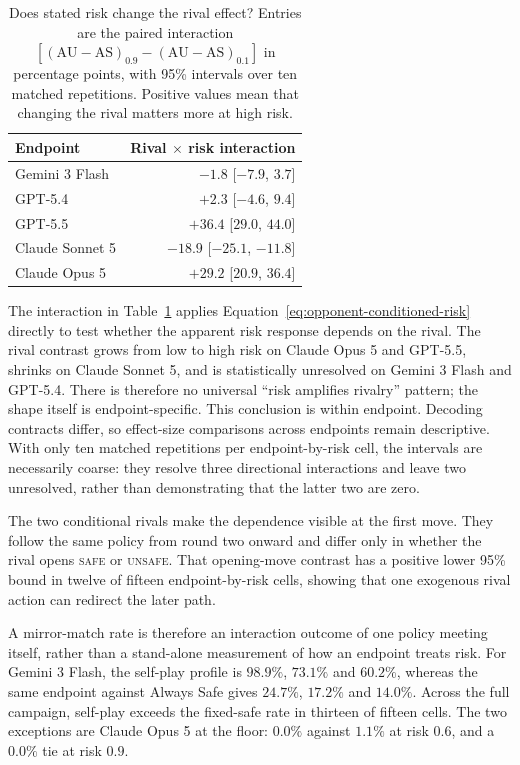 \documentclass[sigconf,anonymous]{aamas}
\newcommand{\Safe}{\textsc{safe}}
\newcommand{\Unsafe}{\textsc{unsafe}}
\begin{document}
\begin{table}[t]
\caption{Does stated risk change the rival effect? Entries are the paired
interaction $[(\mathrm{AU}-\mathrm{AS})_{0.9}-(\mathrm{AU}-\mathrm{AS})_{0.1}]$
in percentage points, with 95\% intervals over ten matched repetitions. Positive
values mean that changing the rival matters more at high risk.}
\label{tab:rival-risk-interaction}
\centering
\footnotesize
\begin{tabular}{@{}lr@{}}
\toprule
Endpoint & Rival $\times$ risk interaction \\
\midrule
Gemini 3 Flash  & $-1.8$ [$-7.9$, $3.7$] \\
GPT-5.4         & $+2.3$ [$-4.6$, $9.4$] \\
GPT-5.5         & $+36.4$ [$29.0$, $44.0$] \\
Claude Sonnet 5 & $-18.9$ [$-25.1$, $-11.8$] \\
Claude Opus 5   & $+29.2$ [$20.9$, $36.4$] \\
\bottomrule
\end{tabular}
\end{table}

The interaction in Table~\ref{tab:rival-risk-interaction} applies
Equation~\ref{eq:opponent-conditioned-risk} directly to test whether the apparent
risk response depends on the rival. The rival contrast grows
from low to high risk on Claude Opus 5 and GPT-5.5, shrinks on Claude Sonnet 5,
and is statistically unresolved on Gemini 3 Flash and GPT-5.4. There is therefore
no universal ``risk amplifies rivalry'' pattern; the shape itself is
endpoint-specific. This conclusion is within endpoint. Decoding contracts differ,
so effect-size comparisons across endpoints remain descriptive.
With only ten matched repetitions per endpoint-by-risk cell, the intervals are
necessarily coarse: they resolve three directional interactions and leave two
unresolved, rather than demonstrating that the latter two are zero.

The two conditional rivals make the dependence visible at the first move. They
follow the same policy from round two onward and differ only in whether the rival
opens \Safe{} or \Unsafe{}. That opening-move contrast has a positive lower 95\%
bound in twelve of fifteen endpoint-by-risk cells, showing that one exogenous
rival action can redirect the later path.

A mirror-match rate is therefore an interaction outcome of one policy meeting
itself, rather than a stand-alone measurement of how an endpoint treats risk.
For Gemini 3 Flash, the self-play profile is $98.9\%$, $73.1\%$ and $60.2\%$,
whereas the same endpoint against Always Safe gives $24.7\%$, $17.2\%$ and
$14.0\%$. Across the full campaign, self-play exceeds the fixed-safe rate in
thirteen of fifteen cells. The two exceptions are Claude Opus 5 at the floor:
$0.0\%$ against $1.1\%$ at risk $0.6$, and a $0.0\%$ tie at risk $0.9$.
\end{document}
